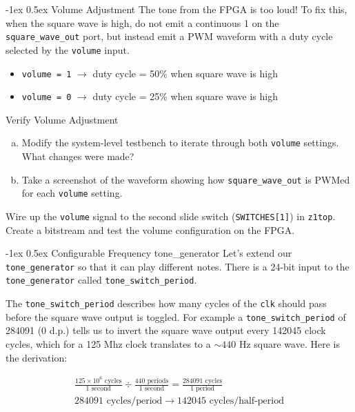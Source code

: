 \documentclass[11pt]{article}
\makeatletter
\renewcommand{\subsection}
{\@startsection {subsection}{1}{0pt}
 {-1ex}
 {0.5ex}
 {\bfseries\normalsize}}
\makeatother
\begin{document}
\subsection{Volume Adjustment}
The tone from the FPGA is too loud!
To fix this, when the square wave is high, do not emit a continuous 1 on the \verb|square_wave_out| port, but instead emit a PWM waveform with a duty cycle selected by the \verb|volume| input.
\begin{itemize}
  \item \verb|volume = 1| $\rightarrow$ duty cycle = 50\% when square wave is high
  \item \verb|volume = 0| $\rightarrow$ duty cycle = 25\% when square wave is high
\end{itemize}

\begin{texexptitled}{Verify Volume Adjustment}{}
  \begin{enumerate}[a)]
    \item Modify the system-level testbench to iterate through both \verb|volume| settings. What changes were made?
    \item Take a screenshot of the waveform showing how \verb|square_wave_out| is PWMed for each \verb|volume| setting.
  \end{enumerate}
\end{texexptitled}

Wire up the \verb|volume| signal to the second slide switch (\verb|SWITCHES[1]|) in \verb|z1top|.
Create a bitstream and test the volume configuration on the FPGA.

\subsection{Configurable Frequency tone\_generator}
Let's extend our \verb|tone_generator| so that it can play different notes.
There is a 24-bit input to the \verb|tone_generator| called \verb|tone_switch_period|.

The \verb|tone_switch_period| describes how many cycles of the \verb|clk| should pass before the square wave output is toggled.
For example a \verb|tone_switch_period| of 284091 (0 d.p.) tells us to invert the square wave output every 142045 clock cycles, which for a 125 Mhz clock translates to a $\sim 440$ Hz square wave. Here is the derivation:

\begin{eqnarray}
  \frac{125 \times 10^6 \text{ cycles}}{1 \text{ second}} \div \frac{440 \text{ periods}}{1 \text{ second}} = \frac{ 284091 \text{ cycles}}{1 \text{ period}} \nonumber \\
  284091 \text{ cycles/period} \rightarrow 142045 \text{ cycles/half-period} \nonumber
\end{eqnarray}
\end{document}
